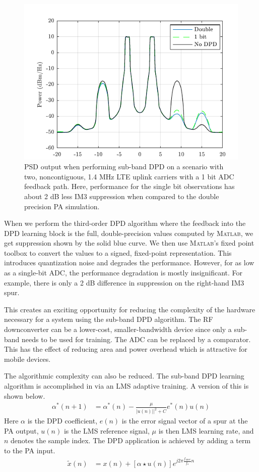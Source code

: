 \documentclass[conference]{IEEEtran}
\begin{document}
\begin{figure}[]
\centering
\includegraphics[]{SubBandPSD}
\caption{PSD output when performing sub-band DPD on a scenario with two, noncontiguous, 1.4 MHz LTE uplink carriers with a 1 bit ADC feedback path. Here, performance for the single bit observations has about 2 dB less IM3 suppression when compared to the double precision PA simulation. }
\label{subbandpsd}
\end{figure}

 When we perform the third-order DPD algorithm where the feedback into the DPD learning block is the full, double-precision values computed by \textsc{Matlab}, we get suppression shown by the solid blue curve. We then use \textsc{Matlab}'s fixed point toolbox to convert the values to a signed, fixed-point representation. This introduces quantization noise and degrades the performance. 
 However, for as low as a single-bit ADC, the performance degradation is mostly insignificant. For example, there is only a 2 dB difference in suppression on the right-hand IM3 spur. 
 
 This creates an exciting opportunity for reducing the complexity of the hardware necessary for a system using the sub-band DPD algorithm. 
 The RF downconverter can be a lower-cost, smaller-bandwidth device since only a sub-band needs to be used for training.
 The ADC can be replaced by a comparator.
 This has the effect of reducing area and power overhead which is attractive for mobile devices.
 
 The algorithmic complexity can also be reduced. The sub-band DPD learning algorithm is accomplished in \cite{TMTT_SubbandDPD} via an LMS adaptive training. A version of this is shown below.
 \begin{align}
 \alpha^*(n+1) &= \alpha^*(n) - \frac{\mu}{|u(n)||^2 + C} e^*(n) u(n)
 \label{eq:NLMS_Update_memory}
 \end{align}
Here $\alpha$ is the DPD coefficient,
$e(n)$ is the error signal vector of a spur at the PA output, $u(n)$ is the LMS reference signal, $\mu$ is then LMS learning rate, and $n$ denotes the sample index. 
The DPD application is achieved by adding a term to the PA input.
\begin{align}
\tilde{x}(n) &=  x(n) + \left[\alpha \star u(n) \right] e^{j 2\pi \frac{f_{spur}}{f_s} n}
\end{align}
\end{document}
